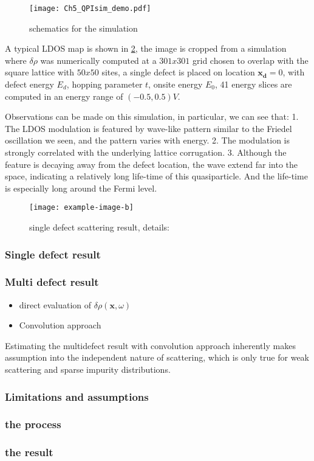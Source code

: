 \begin{figure}
	\centering
	\texttt{[image: Ch5\_QPIsim\_demo.pdf]}
	\caption{schematics for the simulation}
	\label{fig:ch5_qpisim_demo}
\end{figure}

A typical \ac{LDOS} map is shown in \ref{fig:ch5_single_scattering}, the image is cropped from a simulation where $\delta\rho$ was numerically computed at a $301x301$ grid chosen to overlap with the square lattice with $50x50$ sites, a single defect is placed on location $\mathbf{x_d}=0$, with defect energy $E_d$, hopping parameter $t$, onsite energy $E_0$, 41 energy slices are computed in an energy range of $(-0.5, 0.5)V$. 

Observations can be made on this simulation, in particular, we can see that:
1. The \ac{LDOS} modulation is featured by wave-like pattern similar to the Friedel oscillation we seen, and the pattern varies with energy.
2. The modulation is strongly correlated with the underlying lattice corrugation. 
3. Although the feature is decaying away from the defect location, the wave extend far into the space, indicating a relatively long life-time of this quasiparticle. And the life-time is especially long around the Fermi level.


\begin{figure}
	\centering
	\texttt{[image: example-image-b]} %
	\caption{single defect scattering result, details: }
	\label{fig:ch5_single_scattering}
\end{figure}

\subsubsection{Single defect result}

\subsubsection{Multi defect result}
\begin{itemize}
	\item direct evaluation of $\delta\rho(\mathbf{x},\omega)$
	\item Convolution approach
\end{itemize} 
Estimating the multidefect result with convolution approach inherently makes assumption into the independent nature of scattering, which is only true for weak scattering and sparse impurity distributions. 

\subsubsection{Limitations and assumptions}


\subsubsection{the process}
\subsubsection{the result}



